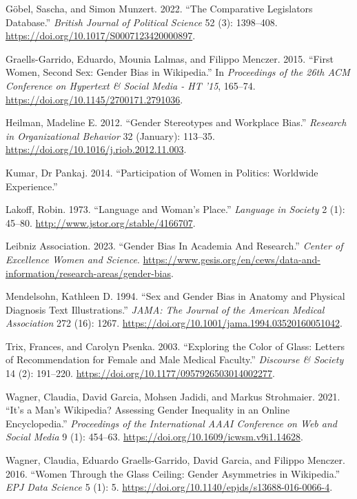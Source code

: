 \documentclass[
]{article}
\newlength{\cslhangindent}
\newlength{\cslentryspacingunit} %
\newenvironment{CSLReferences}[2] %
 {%
  \setlength{\parindent}{0pt}
  \ifodd #1
  \let\oldpar\par
  \def\par{\hangindent=\cslhangindent\oldpar}
  \fi
  \setlength{\parskip}{#2\cslentryspacingunit}
 }%
 {}
\begin{document}
\begin{CSLReferences}{1}{0}
\leavevmode{}%
Göbel, Sascha, and Simon Munzert. 2022. {``The {Comparative}
{Legislators} {Database}.''} \emph{British Journal of Political Science}
52 (3): 1398--408. \url{https://doi.org/10.1017/S0007123420000897}.

\leavevmode{}%
Graells-Garrido, Eduardo, Mounia Lalmas, and Filippo Menczer. 2015.
{``First {Women}, {Second} {Sex}: {Gender} {Bias} in {Wikipedia}.''} In
\emph{Proceedings of the 26th {ACM} {Conference} on {Hypertext} \&
{Social} {Media} - {HT} '15}, 165--74.
\url{https://doi.org/10.1145/2700171.2791036}.

\leavevmode{}%
Heilman, Madeline E. 2012. {``Gender Stereotypes and Workplace Bias.''}
\emph{Research in Organizational Behavior} 32 (January): 113--35.
\url{https://doi.org/10.1016/j.riob.2012.11.003}.

\leavevmode{}%
Kumar, Dr Pankaj. 2014. {``Participation of {Women} in {Politics}:
{Worldwide} Experience.''}

\leavevmode{}%
Lakoff, Robin. 1973. {``Language and {Woman}'s {Place}.''}
\emph{Language in Society} 2 (1): 45--80.
\url{http://www.jstor.org/stable/4166707}.

\leavevmode{}%
Leibniz Association. 2023. {``Gender {Bias} {In} {Academia} {And}
{Research}.''} \emph{Center of Excellence Women and Science}.
\url{https://www.gesis.org/en/cews/data-and-information/research-areas/gender-bias}.

\leavevmode{}%
Mendelsohn, Kathleen D. 1994. {``Sex and {Gender} {Bias} in {Anatomy}
and {Physical} {Diagnosis} {Text} {Illustrations}.''} \emph{JAMA: The
Journal of the American Medical Association} 272 (16): 1267.
\url{https://doi.org/10.1001/jama.1994.03520160051042}.

\leavevmode{}%
Trix, Frances, and Carolyn Psenka. 2003. {``Exploring the {Color} of
{Glass}: {Letters} of {Recommendation} for {Female} and {Male} {Medical}
{Faculty}.''} \emph{Discourse \& Society} 14 (2): 191--220.
\url{https://doi.org/10.1177/0957926503014002277}.

\leavevmode{}%
Wagner, Claudia, David Garcia, Mohsen Jadidi, and Markus Strohmaier.
2021. {``It's a {Man}'s {Wikipedia}? {Assessing} {Gender} {Inequality}
in an {Online} {Encyclopedia}.''} \emph{Proceedings of the International
AAAI Conference on Web and Social Media} 9 (1): 454--63.
\url{https://doi.org/10.1609/icwsm.v9i1.14628}.

\leavevmode{}%
Wagner, Claudia, Eduardo Graells-Garrido, David Garcia, and Filippo
Menczer. 2016. {``Women Through the Glass Ceiling: Gender Asymmetries in
{Wikipedia}.''} \emph{EPJ Data Science} 5 (1): 5.
\url{https://doi.org/10.1140/epjds/s13688-016-0066-4}.

\end{CSLReferences}
\end{document}
